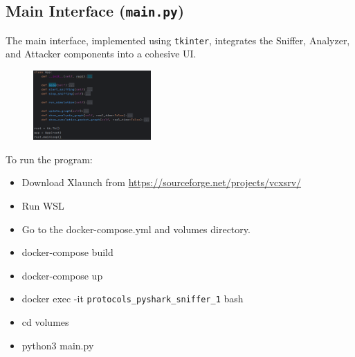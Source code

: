 \documentclass{article}
\begin{document}
\subsection{Main Interface (\texttt{main.py})}
The main interface, implemented using \texttt{tkinter}, integrates the Sniffer, Analyzer, and Attacker components into a cohesive UI.
\begin{figure}[H]
    \centering
    \includegraphics[width=0.4\textwidth]{main.png}
\end{figure}
To run the program:
\begin{itemize}
    \item Download Xlaunch from \url{https://sourceforge.net/projects/vcxsrv/}
    \item Run WSL
    \item Go to the docker-compose.yml and volumes directory.
    \item docker-compose build
    \item docker-compose up
    \item docker exec -it \texttt{protocols\_pyshark\_sniffer\_1} bash
    \item cd volumes
    \item python3 main.py
\end{itemize}
\end{document}
